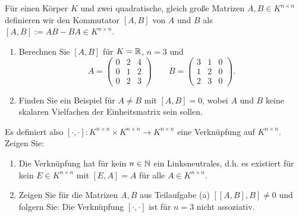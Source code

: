 \begin{Problem}
	F\"{u}r einen Körper $K$ und zwei quadratische, gleich große Matrizen $A,B\in K^{n\times n}$ definieren wir den Kommutator $[A,B]$ von $A$ und $B$ als $[A,B]:=AB-BA\in K^{n\times n}$.
	\begin{enumerate}[label=(\alph*)]
	\item Berechnen Sie $[A,B]$ f\"{u}r $K=\mathbb{R}$, $n=3$ und
		\[
			A=\begin{pmatrix} 0 & 2 & 4 \\ 0 & 1 & 2 \\ 0 & 2 & 3 \end{pmatrix} \qquad B=\begin{pmatrix} 3 & 1 & 0 \\ 1 & 2 & 0 \\ 2 & 3 & 0 \end{pmatrix} 
		.\] 
	\item Finden Sie ein Beispiel f\"{u}r $A\neq B$ mit $[A,B]=0$, wobei $A$ und $B$ keine skalaren Vielfachen der Einheitsmatrix sein sollen.
	\end{enumerate}
	Es definiert also $[\cdot, \cdot]:K^{n\times n}\times K^{n\times n}\to K^{n\times n}$ eine Verknüpfung auf $K^{n\times n}$. Zeigen Sie:
	\begin{enumerate}[label=(\alph*),resume]
		\item Die Verknüpfung hat f\"{u}r kein $n\in \mathbb{N}$ ein Linksneutrales, d.h. es existiert f\"{u}r kein $E\in K^{n\times n}$ mit $[E,A]=A$ f\"{u}r alle $A\in K^{n\times n}$.
		\item Zeigen Sie f\"{u}r die Matrizen $A,B$ aus Teilaufgabe (a) $[[A,B],B]\neq 0$ und folgern Sie: Die Verknüpfung $[\cdot, \cdot]$ ist f\"{u}r $n=3$ nicht assoziativ.
	\end{enumerate}
\end{Problem}

